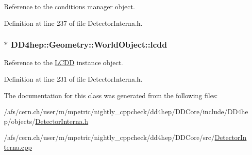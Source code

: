 Reference to the conditions manager object. 

Definition at line 237 of file DetectorInterna.h.\hypertarget{class_d_d4hep_1_1_geometry_1_1_world_object_a72d88491949f298897e034e2e5bc74df}{
\subsubsection[{lcdd}]{$\ast$ {\bf DD4hep::Geometry::WorldObject::lcdd}}}
\label{class_d_d4hep_1_1_geometry_1_1_world_object_a72d88491949f298897e034e2e5bc74df}


Reference to the \hyperlink{class_d_d4hep_1_1_geometry_1_1_l_c_d_d}{LCDD} instance object. 

Definition at line 231 of file DetectorInterna.h.

The documentation for this class was generated from the following files:\begin{DoxyCompactItemize}
\item 
/afs/cern.ch/user/m/mpetric/nightly\_\-cppcheck/dd4hep/DDCore/include/DD4hep/objects/\hyperlink{_detector_interna_8h}{DetectorInterna.h}\item 
/afs/cern.ch/user/m/mpetric/nightly\_\-cppcheck/dd4hep/DDCore/src/\hyperlink{_detector_interna_8cpp}{DetectorInterna.cpp}\end{DoxyCompactItemize}
